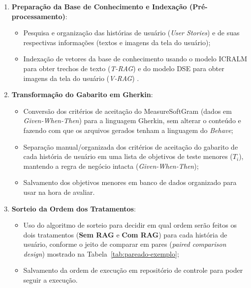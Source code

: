 \begin{enumerate}
    \item \textbf{Preparação da Base de Conhecimento e Indexação (Pré-processamento)}:
    \begin{itemize}
        \item Pesquisa e organização das histórias de usuário (\textit{User Stories}) e de suas respectivas informações (textos e imagens da tela do usuário);
        \item Indexação de vetores da base de conhecimento usando o modelo ICRALM para obter trechos de texto (\textit{T-RAG}) e do modelo DSE para obter imagens da tela do usuário (\textit{V-RAG}) \cite{wang2025}.
    \end{itemize}

    \item \textbf{Transformação do Gabarito em Gherkin}:
    \begin{itemize}
        \item Conversão dos critérios de aceitação do MeasureSoftGram (dados em \textit{Given-When-Then}) para a linguagem Gherkin, sem alterar o conteúdo e fazendo com que os arquivos gerados tenham a linguagem do \textit{Behave};
        \item Separação manual/organizada dos critérios de aceitação do gabarito de cada história de usuário em uma lista de objetivos de teste menores ($T_i$), mantendo a regra de negócio intacta (\textit{Given-When-Then});
        \item Salvamento dos objetivos menores em banco de dados organizado para usar na hora de avaliar.
    \end{itemize}

    \item \textbf{Sorteio da Ordem dos Tratamentos}:
    \begin{itemize}
        \item Uso do algoritmo de sorteio para decidir em qual ordem serão feitos os dois tratamentos (\textbf{Sem RAG} e \textbf{Com RAG}) para cada história de usuário, conforme o jeito de comparar em pares (\textit{paired comparison design}) mostrado na Tabela~\ref{tab:pareado-exemplo};
        \item Salvamento da ordem de execução em repositório de controle para poder seguir a execução.
    \end{itemize}


\end{enumerate}
